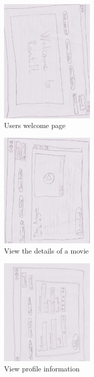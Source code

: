 \begin{figure}[!ht]
  \centering
    \includegraphics[angle=90, width=0.4\textwidth]{Parts/Appendix/Images/PaperMockup/UserWelcome}
  \caption{Users welcome page}
  \label{fig:Appendix_GUI_sketches_UserWelcome}
\end{figure}
\begin{figure}[!ht]
  \centering
    \includegraphics[angle=90, width=0.4\textwidth]{Parts/Appendix/Images/PaperMockup/ViewMovie}
  \caption{View the details of a movie}
  \label{fig:Appendix_GUI_sketches_ViewMovie}
\end{figure}
\begin{figure}[!ht]
  \centering
    \includegraphics[angle=90, width=0.4\textwidth]{Parts/Appendix/Images/PaperMockup/ViewProfile}
  \caption{View profile information}
  \label{fig:Appendix_GUI_sketches_ViewProfile}
\end{figure}
\clearpage
